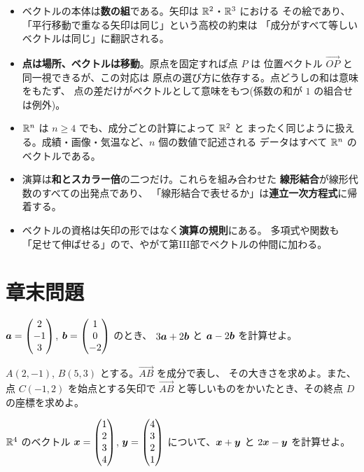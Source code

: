\begin{matome}
\begin{itemize}
\item ベクトルの本体は\textbf{数の組}である。矢印は $\mathbb{R}^2$・$\mathbb{R}^3$ における
その絵であり、「平行移動で重なる矢印は同じ」という高校の約束は
「成分がすべて等しいベクトルは同じ」に翻訳される。
\item \textbf{点は場所、ベクトルは移動}。原点を固定すれば点 $P$ は
位置ベクトル $\overrightarrow{OP}$ と同一視できるが、この対応は
原点の選び方に依存する。点どうしの和は意味をもたず、
点の差だけがベクトルとして意味をもつ(係数の和が $1$ の組合せは例外)。
\item $\mathbb{R}^n$ は $n \ge 4$ でも、成分ごとの計算によって $\mathbb{R}^2$ と
まったく同じように扱える。成績・画像・気温など、$n$ 個の数値で記述される
データはすべて $\mathbb{R}^n$ のベクトルである。
\item 演算は\textbf{和とスカラー倍}の二つだけ。これらを組み合わせた
\textbf{線形結合}が線形代数のすべての出発点であり、
「線形結合で表せるか」は\textbf{連立一次方程式}に帰着する。
\item ベクトルの資格は矢印の形ではなく\textbf{演算の規則}にある。
多項式や関数も「足せて伸ばせる」ので、やがて第III部でベクトルの仲間に加わる。
\end{itemize}
\end{matome}

\section*{章末問題}

\begin{mondai}[基本]\label{q:vec-ex1}
$\bm{a} = \begin{pmatrix}2 \\ -1 \\ 3\end{pmatrix}$, $\bm{b} = \begin{pmatrix}1 \\ 0 \\ -2\end{pmatrix}$ のとき、
$3\bm{a} + 2\bm{b}$ と $\bm{a} - 2\bm{b}$ を計算せよ。
\end{mondai}

\begin{mondai}[基本]\label{q:vec-ex2}
$A(2, -1)$, $B(5, 3)$ とする。$\overrightarrow{AB}$ を成分で表し、
その大きさを求めよ。また、点 $C(-1, 2)$ を始点とする矢印で
$\overrightarrow{AB}$ と等しいものをかいたとき、その終点 $D$ の座標を求めよ。
\end{mondai}

\begin{mondai}[基本]\label{q:vec-ex3}
$\mathbb{R}^4$ のベクトル $\bm{x} = \begin{pmatrix}1 \\ 2 \\ 3 \\ 4\end{pmatrix}$,
$\bm{y} = \begin{pmatrix}4 \\ 3 \\ 2 \\ 1\end{pmatrix}$ について、$\bm{x} + \bm{y}$ と
$2\bm{x} - \bm{y}$ を計算せよ。
\end{mondai}

